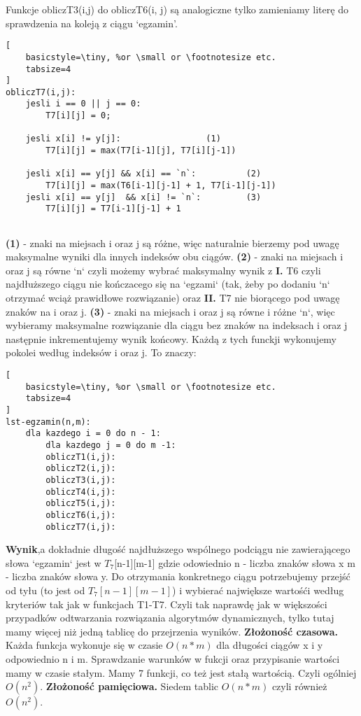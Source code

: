 \documentclass[a4paper,10pt]{article}
\begin{document}
Funkcje obliczT3(i,j) do obliczT6(i, j) są analogiczne tylko zamieniamy literę do sprawdzenia na koleją z ciągu `egzamin'. \newline
\begin{lstlisting}[
    basicstyle=\tiny, %or \small or \footnotesize etc.
    tabsize=4
]
obliczT7(i,j):
	jesli i == 0 || j == 0:
		T7[i][j] = 0;

	jesli x[i] != y[j]:					(1)
		T7[i][j] = max(T7[i-1][j], T7[i][j-1])

	jesli x[i] == y[j] && x[i] == `n`:			(2)
		T7[i][j] = max(T6[i-1][j-1] + 1, T7[i-1][j-1])
	jesli x[i] == y[j]  && x[i] != `n`:			(3)
		T7[i][j] = T7[i-1][j-1] + 1
		
\end{lstlisting}
\textbf{(1)} - znaki na miejsach i oraz j są różne, więc naturalnie bierzemy pod uwagę maksymalne wyniki dla innych indeksów obu ciągów. \newline
\textbf{(2)} - znaki na miejsach i oraz j są równe `n` czyli możemy wybrać maksymalny wynik z \textbf{I.} T6 czyli najdłuższego ciągu nie kończacego się na `egzami` (tak, żeby po dodaniu `n` otrzymać wciąż prawidłowe rozwiązanie) oraz \textbf{II.} T7 nie biorącego pod uwagę znaków na i oraz j. 
\textbf{(3)} -  znaki na miejsach i oraz j są równe i różne `n`, więc wybieramy maksymalne rozwiązanie dla ciągu bez znaków na indeksach i oraz j następnie inkrementujemy wynik końcowy.\newline \newline
Każdą z tych funckji wykonujemy pokolei według indeksów i oraz j. To znaczy: 
\begin{lstlisting}[
    basicstyle=\tiny, %or \small or \footnotesize etc.
    tabsize=4
]
lst-egzamin(n,m):
	dla kazdego i = 0 do n - 1:
		dla kazdego j = 0 do m -1:
		obliczT1(i,j):
		obliczT2(i,j):
		obliczT3(i,j):
		obliczT4(i,j):
		obliczT5(i,j):
		obliczT6(i,j):
		obliczT7(i,j): 

\end{lstlisting}
\newpage
\textbf{Wynik},a dokładnie długość najdłuższego wspólnego podciągu nie zawierającego słowa `egzamin` jest w ${T_7}$[n-1][m-1] gdzie odowiednio \newline n - liczba znaków słowa x \newline  m - liczba znaków słowa y. \newline
Do otrzymania konkretnego ciągu potrzebujemy przejść od tyłu (to jest od $T_7[n-1][m-1]$) i wybierać największe wartośći według kryteriów tak jak w funkcjach T1-T7. 
Czyli tak naprawdę jak w większości przypadków odtwarzania rozwiązania algorytmów dynamicznych, tylko tutaj mamy więcej niż jedną tablicę do przejrzenia wyników. \newline \newline
\textbf{Złożoność czasowa.} \newline
Każda funkcja wykonuje się w czasie $O(n*m)$ dla długości ciągów x i y odpowiednio n i m. Sprawdzanie warunków w fukcji oraz przypisanie wartości mamy w czasie stałym.  Mamy 7 funkcji, co też jest stałą wartością. Czyli ogólniej \textbf{$O(n^2)$}. \newline
\textbf{Złożoność pamięciowa.} \newline
Siedem tablic $O(n*m)$ czyli również \textbf{$O(n^2)$}.
\end{document}
